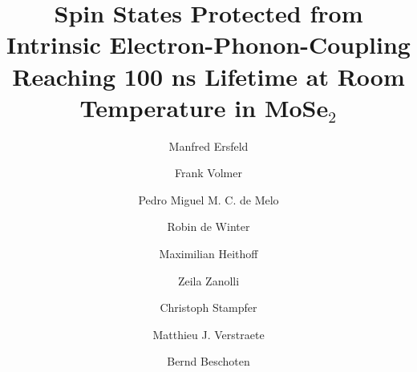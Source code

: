 \documentclass[prb,aps,superscriptaddress,reprint]{revtex4-1}
\begin{document}

\title{Spin States Protected from Intrinsic Electron-Phonon-Coupling Reaching 100 ns Lifetime at Room Temperature in MoSe$_2$}

\author{Manfred Ersfeld}
\affiliation{\aachenphys}
\author{Frank Volmer}
\affiliation{\aachenphys}
\author{Pedro Miguel M. C. de Melo}
\affiliation{\liege}
\affiliation{\etsf}
\author{Robin de Winter}
\affiliation{\aachenphys}
\author{Maximilian Heithoff}
\affiliation{\aachenphys}
\author{Zeila Zanolli}
\affiliation{\etsf}
\affiliation{\barcelona}
\author{Christoph Stampfer}
\affiliation{\aachenphys}
\affiliation{\pgi}
\author{Matthieu J. Verstraete}
\affiliation{\liege}
\affiliation{\etsf}
\author{Bernd Beschoten}
\affiliation{\aachenphys}



\end{document}
